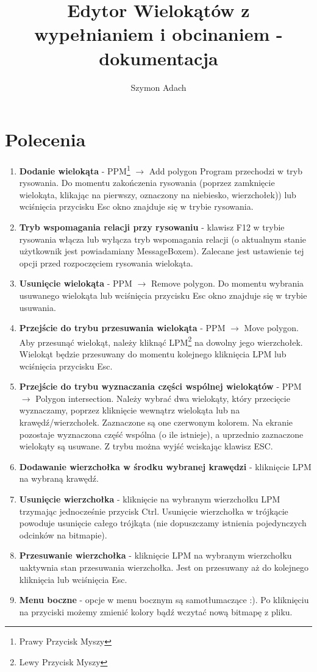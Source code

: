 \documentclass[]{article}
\title{Edytor Wielokątów z wypełnianiem i obcinaniem - dokumentacja}
\author{Szymon Adach}
\begin{document}
\maketitle

\section{Polecenia}
\begin{enumerate}
	\item \textbf{Dodanie wielokąta} - PPM\footnote{Prawy Przycisk Myszy} $\rightarrow$ Add polygon \newline
	Program przechodzi w tryb rysowania. Do momentu zakończenia rysowania (poprzez zamknięcie wielokąta, klikając na pierwszy, oznaczony na niebiesko, wierzchołek)) lub wciśnięcia przycisku Esc okno znajduje się w trybie rysowania.
	\item \textbf{Tryb wspomagania relacji przy rysowaniu} - klawisz F12 w trybie rysowania włącza lub wyłącza tryb wspomagania relacji (o aktualnym stanie użytkownik jest powiadamiany MessageBoxem). Zalecane jest ustawienie tej opcji przed rozpoczęciem rysowania wielokąta.
	\item \textbf{Usunięcie wielokąta} - PPM $\rightarrow$ Remove polygon.
	Do momentu wybrania usuwanego wielokąta lub wciśnięcia przycisku Esc okno znajduje się w trybie usuwania.
	\item \textbf{Przejście do trybu przesuwania wielokąta} - PPM $\rightarrow$ Move polygon. \newline
	Aby przesunąć wielokąt, należy kliknąć LPM\footnote{Lewy Przycisk Myszy} na dowolny jego wierzchołek. Wielokąt będzie przesuwany do momentu kolejnego kliknięcia LPM lub wciśnięcia przycisku Esc.
	\item \textbf{Przejście do trybu wyznaczania części wspólnej wielokątów} - PPM $\rightarrow$ Polygon intersection. \newline
	Należy wybrać dwa wielokąty, który przecięcie wyznaczamy, poprzez kliknięcie wewnątrz wielokąta lub na krawędź/wierzchołek. Zaznaczone są one czerwonym kolorem. Na ekranie pozostaje wyznaczona część wspólna (o ile istnieje), a uprzednio zaznaczone wielokąty są usuwane. Z trybu można wyjść wciskając klawisz ESC.
	\item \textbf{Dodawanie wierzchołka w środku wybranej krawędzi} - kliknięcie LPM na wybraną krawędź.
	\item \textbf{Usunięcie wierzchołka} - kliknięcie na wybranym wierzchołku LPM trzymając jednocześnie przycisk Ctrl. Usunięcie wierzchołka w trójkącie powoduje usunięcie całego trójkąta (nie dopuszczamy istnienia pojedynczych odcinków na bitmapie).
	\item \textbf{Przesuwanie wierzchołka} - kliknięcie LPM na wybranym wierzchołku uaktywnia stan przesuwania wierzchołka. Jest on przesuwany aż do kolejnego kliknięcia lub wciśnięcia Esc.
	\item \textbf{Menu boczne} - opcje w menu bocznym są samotłumaczące :). Po kliknięciu na przyciski możemy  zmienić kolory bądź wczytać nową bitmapę z pliku.
\end{enumerate}
\end{document}
